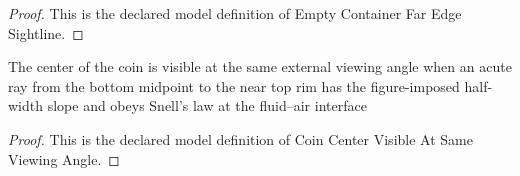 \begin{proof}
  This is the declared model definition of Empty Container Far Edge Sightline.
\end{proof}
\begin{definition}
  \label{def:physics:phyx-mini-0005:phyxminiproblems-problemphyxmini0005-coincentervisibleatsameviewingangle}
  The center of the coin is visible at the same external viewing angle when an acute ray from the bottom midpoint to the near top rim has the figure-imposed half-width slope and obeys Snell's law at the fluid--air interface
\end{definition}
\begin{proof}
  This is the declared model definition of Coin Center Visible At Same Viewing Angle.
\end{proof}
